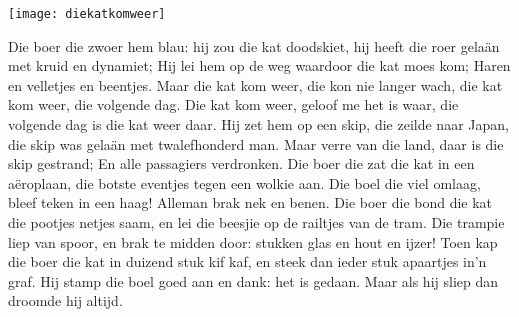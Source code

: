 \begin{intersong}
    \texttt{[image: diekatkomweer]}
\end{intersong}
\beginverse
Die boer die zwoer hem blau: hij zou die kat doodskiet,
hij heeft die roer gelaän met kruid en dynamiet;
Hij lei hem op de weg waardoor die kat moes kom;
Haren en velletjes en beentjes.
\endverse
\beginchorus
Maar die kat kom weer, die kon nie langer wach,
die kat kom weer, die volgende dag.
Die kat kom weer, geloof me het is waar,
die volgende dag is die kat weer daar.
\endchorus
\beginverse
Hij zet hem op een skip, die zeilde naar Japan,
die skip was gelaän met twalefhonderd man.
Maar verre van die land, daar is die skip gestrand;
En alle passagiers verdronken.
\endverse
\beginverse
Die boer die zat die kat in een aëroplaan,
die botste eventjes tegen een wolkie aan.
Die boel die viel omlaag, bleef teken in een haag!
Alleman brak nek en benen.
\endverse
\beginverse
Die boer die bond die kat die pootjes netjes saam,
en lei die beesjie op de railtjes van de tram.
Die trampie liep van spoor, en brak te midden door:
stukken glas en hout en ijzer!
\endverse
\beginverse
Toen kap die boer die kat in duizend stuk kif kaf, 
en steek dan ieder stuk apaartjes in’n graf.
Hij stamp die boel goed aan en dank: het is gedaan.
Maar als hij sliep dan droomde hij altijd. 
\endverse
\endsong